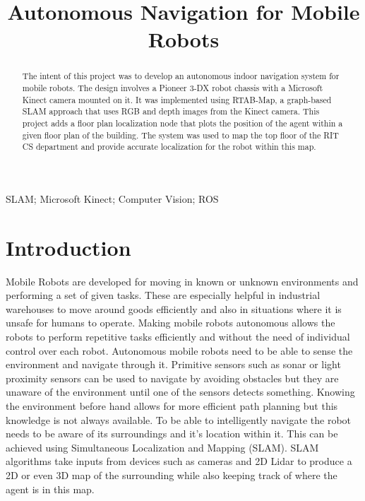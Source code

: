 \documentclass[conference, letterpaper]{IEEEtran}
\begin{document}
\title{Autonomous Navigation for Mobile Robots}

\author{
}

\maketitle

\begin{abstract}
The intent of this project was to develop an autonomous indoor navigation system
for mobile robots. The design involves a Pioneer 3-DX robot chassis with a 
Microsoft Kinect camera mounted on it. It was implemented using RTAB-Map, a 
graph-based SLAM approach that uses RGB and depth images from the Kinect camera.
This project adds a floor plan localization node that plots the position of the 
agent within a given floor plan of the building. The system was used to map the 
top floor of the RIT CS department and provide accurate localization for the 
robot within this map.
\end{abstract}

\begin{IEEEkeywords}
SLAM; Microsoft Kinect; Computer Vision; ROS
\end{IEEEkeywords}

\IEEEpeerreviewmaketitle

\section{Introduction}
Mobile Robots are developed for moving in known or unknown environments and 
performing a set of given tasks. These are especially helpful in industrial 
warehouses to move around goods efficiently and also in situations where it is 
unsafe for humans to operate. Making mobile robots autonomous allows the 
robots to perform repetitive tasks efficiently and without the need of 
individual control over each robot. Autonomous mobile robots need to be 
able to sense the environment and navigate through it. Primitive sensors such as
sonar or light proximity sensors can be used to navigate by avoiding obstacles 
but they are unaware of the environment until one of the sensors detects 
something. Knowing the environment before hand allows for more efficient path 
planning but this knowledge is not always available. To be able to intelligently
navigate the robot needs to be aware of its surroundings and it's location within
it. This can be achieved using Simultaneous Localization and Mapping (SLAM). 
SLAM algorithms take inputs from devices such as cameras and 2D Lidar to produce
a 2D or even 3D map of the surrounding while also keeping track of where the 
agent is in this map. 
\end{document}

